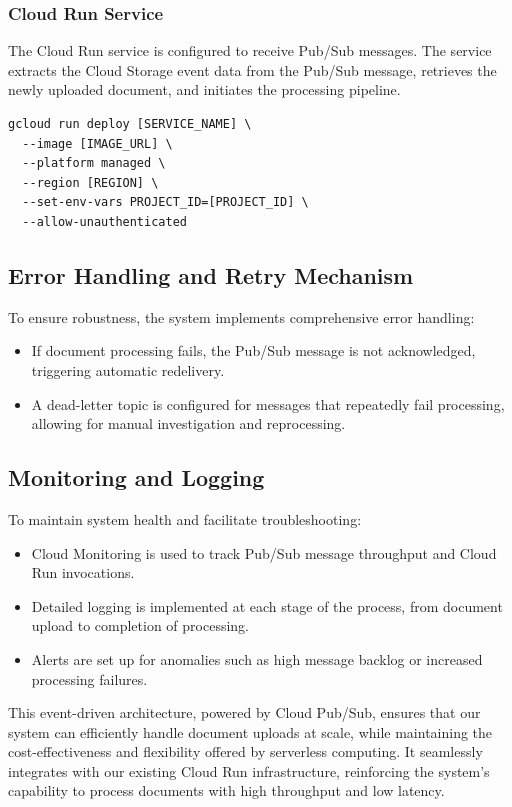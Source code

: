 \documentclass[a4paper, 12pt]{report}
\begin{document}
\subsubsection{Cloud Run Service}
The Cloud Run service is configured to receive Pub/Sub messages. The service extracts the Cloud Storage event data from the Pub/Sub message, retrieves the newly uploaded document, and initiates the processing pipeline.

\begin{verbatim}
gcloud run deploy [SERVICE_NAME] \
  --image [IMAGE_URL] \
  --platform managed \
  --region [REGION] \
  --set-env-vars PROJECT_ID=[PROJECT_ID] \
  --allow-unauthenticated
\end{verbatim}

\subsection{Error Handling and Retry Mechanism}
To ensure robustness, the system implements comprehensive error handling:

\begin{itemize}
    \item If document processing fails, the Pub/Sub message is not acknowledged, triggering automatic redelivery.
    \item A dead-letter topic is configured for messages that repeatedly fail processing, allowing for manual investigation and reprocessing.
\end{itemize}

\subsection{Monitoring and Logging}
To maintain system health and facilitate troubleshooting:

\begin{itemize}
    \item Cloud Monitoring is used to track Pub/Sub message throughput and Cloud Run invocations.
    \item Detailed logging is implemented at each stage of the process, from document upload to completion of processing.
    \item Alerts are set up for anomalies such as high message backlog or increased processing failures.
\end{itemize}

This event-driven architecture, powered by Cloud Pub/Sub, ensures that our system can efficiently handle document uploads at scale, while maintaining the cost-effectiveness and flexibility offered by serverless computing. It seamlessly integrates with our existing Cloud Run infrastructure, reinforcing the system's capability to process documents with high throughput and low latency.
\end{document}
